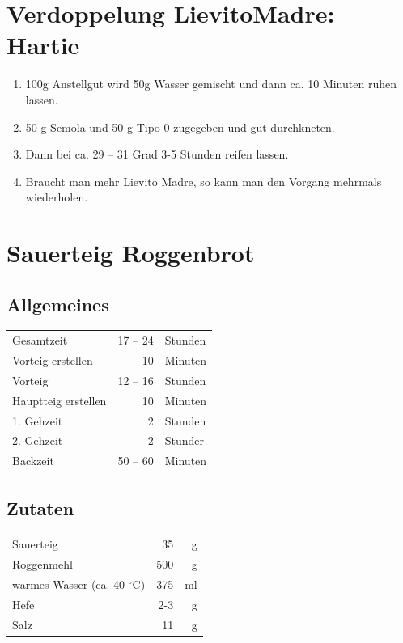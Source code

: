 \section{Verdoppelung \Gls{LievitoMadre}: Hartie}\label{sec:Lievito Madre}

\begin{enumerate}
    \item 100\;g Anstellgut wird 50\;g Wasser gemischt und dann ca. 10 Minuten ruhen lassen.  
    \item 50 g Semola und 50 g Tipo 0 zugegeben und gut durchkneten.
    \item Dann bei ca. 29 -- 31 Grad 3-5 Stunden reifen lassen.
    \item Braucht man mehr Lievito Madre, so kann man den Vorgang mehrmals wiederholen.
\end{enumerate}

\section{Sauerteig Roggenbrot} 
\subsection*{Allgemeines}
\begin{tabular}{lrl}
	Gesamtzeit          & 17 --  24 & Stunden                        \\
	Vorteig erstellen   &        10 & Minuten                        \\
	Vorteig             &  12 -- 16 & Stunden                        \\
	Hauptteig erstellen &        10 & Minuten                        \\
	1. Gehzeit          &         2 & Stunden                        \\
	2. Gehzeit          &         2 & Stunder                        \\
	Backzeit            &  50 -- 60 & Minuten                        \\
\end{tabular} 
\subsection*{Zutaten}
\begin{tabular}{lrr}
	Sauerteig                        & 35  &  g \\
	Roggenmehl                       & 500 &  g \\
	warmes Wasser (ca. 40 $^\circ$C) & 375 & ml \\
	Hefe                             & 2-3 &  g \\
	Salz                             & 11  & g
\end{tabular} 


